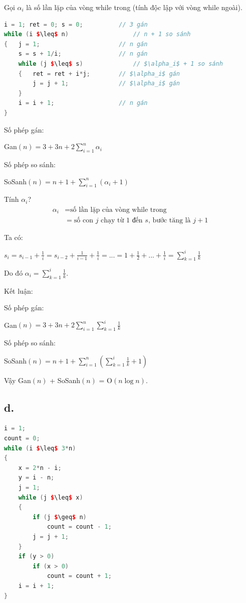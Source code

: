 \documentclass[12pt, a4paper, fleqn]{article}
\begin{document}
	Gọi $\alpha_i$ là số lần lặp của vòng while trong (tính độc lập với vòng while ngoài).
	
	\begin{lstlisting}[language = C++, mathescape, texcl]
i = 1; ret = 0; s = 0; 			// 3 gán
while (i $\leq$ n)					// n + 1 so sánh
{	j = 1;						// n gán
	s = s + 1/i;				// n gán
	while (j $\leq$ s)				// $\alpha_i$ + 1 so sánh
	{	ret = ret + i*j;		// $\alpha_i$ gán
		j = j + 1;				// $\alpha_i$ gán
	}
	i = i + 1;					// n gán
}
	\end{lstlisting}
	
	Số phép gán:
	
	Gan$\displaystyle (n) = 3 + 3n + 2 \sum_{i = 1}^n \alpha_i$
	
	Số phép so sánh:
	
	SoSanh$\displaystyle (n) = n + 1 + \sum_{i = 1}^n (\alpha_i + 1)$
	
	Tính $\alpha_i$?
	\begin{align*}
	\alpha_i &= \text{số lần lặp của vòng while trong} \\
			 &= \text{số con $j$ chạy từ 1 đến $s$, bước tăng là $j + 1$} 
	\end{align*}
	
	Ta có:
	
	$\displaystyle s_i = s_{i - 1} + \frac{1}{i} = s_{i - 2} + \frac{1}{i - 1} + \frac{1}{i} = ... = 1 + \frac{1}{2} + ... + \frac{1}{i} = \sum_{k = 1}^i \frac{1}{k}$
	
	Do đó $\displaystyle \alpha_i = \sum_{k = 1}^i \frac{1}{k}$.
	
	Kết luận:
	
	Số phép gán:
	
	Gan$\displaystyle (n) = 3 + 3n + 2 \sum_{i = 1}^n \sum_{k = 1}^i \frac{1}{k}$
	
	Số phép so sánh:
	
	SoSanh$\displaystyle (n) = n + 1 + \sum_{i = 1}^n \left( \sum_{k = 1}^i \frac{1}{k} + 1 \right) $
	
	Vậy Gan$(n)$ + SoSanh$(n)$ = O$(n \log n)$.

	\subsection*{d.}
	
	\begin{lstlisting}[language = C++, mathescape]
i = 1;
count = 0;
while (i $\leq$ 3*n)
{
	x = 2*n - i;
	y = i - n;
	j = 1;
	while (j $\leq$ x)
	{
		if (j $\geq$ n)
			count = count - 1;
		j = j + 1;
	}
	if (y > 0)
		if (x > 0)
			count = count + 1;
	i = i + 1;
}
\end{lstlisting}
\end{document}
